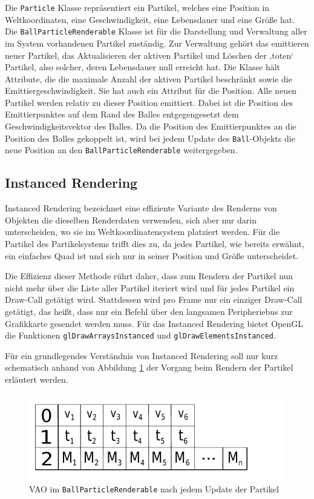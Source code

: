 Die {\texttt{Particle}} Klasse repräsentiert ein Partikel, welches eine Position in Weltkoordinaten, eine Geschwindigkeit, eine Lebensdauer und eine Größe hat. 
Die {\texttt{BallParticleRenderable}} Klasse ist für die Darstellung und Verwaltung aller im System vorhandenen Partikel zuständig. Zur Verwaltung gehört das emittieren neuer Partikel, das Aktualisieren der aktiven Partikel und Löschen der ‚toten‘ Partikel, also solcher, deren Lebensdauer null erreicht hat. Die Klasse hält Attribute, die die maximale Anzahl der aktiven Partikel beschränkt sowie die Emittiergeschwindigkeit.  Sie hat auch ein Attribut für die Position. Alle neuen Partikel werden relativ zu dieser Position emittiert. Dabei ist die Position des Emittierpunktes auf dem Rand des Balles entgegengesetzt dem Geschwindigkeitsvektor des Balles. Da die Position des Emittierpunktes an die Position des Balles gekoppelt ist, wird bei jedem Update des {\texttt{Ball}}-Objekts die neue Position an den {\texttt{BallParticleRenderable}} weitergegeben.

\subsection{Instanced Rendering}
\label{Kapitel_2_-_Unterkapitel_2.2}
%
Instanced Rendering bezeichnet eine effiziente Variante des Renderns von Objekten die dieselben Renderdaten verwenden, sich aber nur darin unterscheiden, wo sie im Weltkoordinatensystem platziert werden. Für die Partikel des Partikelsystems trifft dies zu, da jedes Partikel, wie bereits erwähnt, ein einfaches Quad ist und sich nur in seiner Position und Größe unterscheidet.

Die Effizienz dieser Methode rührt daher, dass zum Rendern der Partikel nun nicht mehr über die Liste aller Partikel iteriert wird und für jedes Partikel ein Draw-Call getätigt wird. Stattdessen wird pro Frame nur ein einziger Draw-Call getätigt, das heißt, dass nur ein Befehl über den langsamen Peripheriebus zur Grafikkarte gesendet werden muss. Für das Instanced Rendering bietet OpenGL die Funktionen {\texttt{glDrawArraysInstanced}} und {\texttt{glDrawElementsInstanced}}.

Für ein grundlegendes Verständnis von Instanced Rendering soll nur kurz schematisch anhand von Abbildung \ref{fig:vao} der Vorgang beim Rendern der Partikel erläutert werden.

\begin{figure}[t]
	\centering
	\includegraphics[scale=0.8]{bilder/vao2}
	\caption{VAO im {\texttt{BallParticleRenderable}} nach jedem Update der Partikel}
	\label{fig:vao}
\end{figure}

